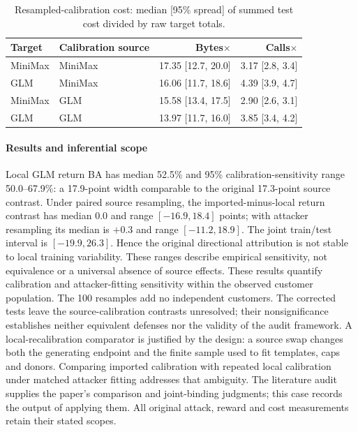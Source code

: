 \begin{table}[ht]\centering\small
\caption{Resampled-calibration cost: median [95\% spread] of summed test cost divided by raw target totals.}\label{tab:r21-cost}
\begin{tabular}{llrr}\toprule
Target & Calibration source & Bytes$\times$ & Calls$\times$\\\midrule
MiniMax & MiniMax & 17.35 [12.7, 20.0] & 3.17 [2.8, 3.4] \\
GLM & MiniMax & 16.06 [11.7, 18.6] & 4.39 [3.9, 4.7] \\
MiniMax & GLM & 15.58 [13.4, 17.5] & 2.90 [2.6, 3.1] \\
GLM & GLM & 13.97 [11.7, 16.0] & 3.85 [3.4, 4.2] \\
\bottomrule\end{tabular}\end{table}

\paragraph{Results and inferential scope}
Local GLM return BA has median 52.5\% and 95\% calibration-sensitivity range 50.0--67.9\%: a 17.9-point width comparable to the original 17.3-point source contrast. Under paired source resampling, the imported-minus-local return contrast has median 0.0 and range $[-16.9,18.4]$ points; with attacker resampling its median is $+0.3$ and range $[-11.2,18.9]$. The joint train/test interval is $[-19.9,26.3]$. Hence the original directional attribution is not stable to local training variability. These ranges describe empirical sensitivity, not equivalence or a universal absence of source effects.
These results quantify calibration and attacker-fitting sensitivity within the observed customer population. The 100 resamples add no independent customers. The corrected tests leave the source-calibration contrasts unresolved; their nonsignificance establishes neither equivalent defenses nor the validity of the audit framework. A local-recalibration comparator is justified by the design: a source swap changes both the generating endpoint and the finite sample used to fit templates, caps and donors. Comparing imported calibration with repeated local calibration under matched attacker fitting addresses that ambiguity. The literature audit supplies the paper's comparison and joint-binding judgments; this case records the output of applying them. All original attack, reward and cost measurements retain their stated scopes.
